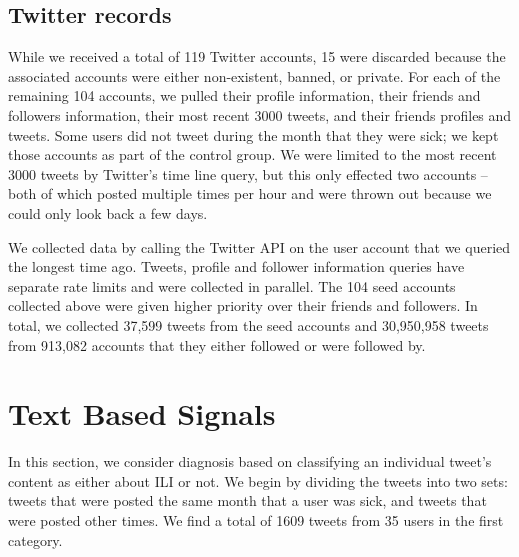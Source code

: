 \documentclass{acm_proc_article-sp}
\begin{document}
\subsection{Twitter records}
While we received a total of 119 Twitter accounts, 15 were discarded because the associated accounts were either non-existent, banned, or private. For each of the remaining 104 accounts, we pulled their profile information, their friends and followers information, their most recent 3000 tweets, and their friends profiles and tweets. Some users did not tweet during the month that they were sick; we kept those accounts as part of the control group. We were limited to the most recent 3000 tweets by Twitter's time line query, but this only effected two accounts -- both of which posted multiple times per hour and were thrown out because we could only look back a few days.

We collected data by calling the Twitter API on the user account that we queried the longest time ago. Tweets, profile and follower information queries have separate rate limits and were collected in parallel. The 104 seed accounts collected above were given higher priority over their friends and followers. In total, we collected 37,599 tweets from the seed accounts and 30,950,958 tweets from 913,082 accounts that they either followed or were followed by.


\section{Text Based Signals}
\label{sec:text_analysis}

In this section, we consider diagnosis based on classifying an individual tweet's content as either about ILI or not. We begin by dividing the tweets into two sets: tweets that were posted the same month that a user was sick, and tweets that were posted other times. We find a total of 1609 tweets from 35 users in the first category.
\end{document}

